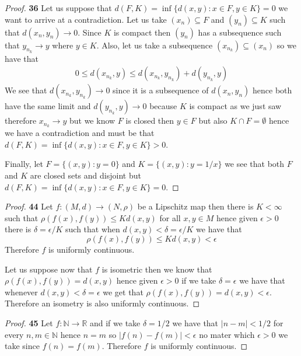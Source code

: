 \documentclass[11pt]{article}
\newcommand{\N}{\mathbb{N}}
\newcommand{\R}{\mathbb{R}}
\theoremstyle{definition}
\begin{document}
    \begin{proof}{\textbf{36}}
        Let us suppose that $d(F,K) = \inf\{d(x,y): x \in F, y \in K\} = 0$ 
        we want to arrive at a contradiction. Let us take
        $(x_n) \subseteq F$ and $(y_n) \subseteq K$ such that
        $d(x_n, y_n) \to 0$. Since $K$ is compact then $(y_n)$ has a 
        subsequence such that $y_{n_k} \to y$ where $y \in K$. Also, let us
        take a subsequence $(x_{n_k}) \subseteq (x_n)$ so we have that
        \begin{align*}
            0 \leq d(x_{n_k}, y) \leq d(x_{n_k}, y_{n_k}) + d(y_{n_k}, y)
        \end{align*}
        We see that $d(x_{n_k}, y_{n_k}) \to 0$ since it is a subsequence
        of $d(x_n, y_n)$ hence both have the same limit and $d(y_{n_k}, y) \to 0$
        because $K$ is compact as we just saw therefore $x_{n_k} \to y$
        but we know $F$ is closed then $y \in F$ but also
        $K \cap F = \emptyset$ hence we have a contradiction and must be
        that $d(F,K) = \inf\{d(x,y): x \in F, y \in K\} > 0$.
        
        Finally, let $F = \{(x,y): y= 0\}$ and $K = \{(x,y) : y = 1/x\}$ we see
        that both $F$ and $K$ are closed sets and disjoint but
        $d(F,K) = \inf\{d(x,y): x \in F, y\in K\} = 0$.
    \end{proof}
    \cleardoublepage
    \begin{proof}{\textbf{44}}
        Let $f:(M,d) \to (N, \rho)$ be a Lipschitz map then there is
        $K < \infty$ such that $\rho(f(x), f(y)) \leq Kd(x,y)$ for all
        $x,y \in M$ hence given $\epsilon > 0$ there is $\delta = \epsilon/K$
        such that when $d(x,y) < \delta = \epsilon/K$ we have that
        $$\rho(f(x), f(y)) \leq Kd(x,y) < \epsilon$$
        Therefore $f$ is uniformly continuous.

        Let us suppose now that $f$ is isometric then we know that
        $\rho(f(x), f(y)) = d(x,y)$ hence given $\epsilon > 0$ if we take
        $\delta = \epsilon$ we have that whenever $d(x,y) < \delta = \epsilon$
        we get that $\rho(f(x), f(y)) = d(x,y) < \epsilon$. Therefore an
        isometry is also uniformly continuous. 
    \end{proof}
    \begin{proof}{\textbf{45}}
        Let $f:\N \to \R$ and if we take $\delta = 1/2$
        we have that $|n - m| < 1/2$ for every $n, m \in \N$ hence
        $n = m$ so $|f(n) - f(m)| < \epsilon$
        no mater which $\epsilon > 0$ we take since $f(n) = f(m)$.
        Therefore $f$ is uniformly continuous.
    \end{proof}
\end{document}
